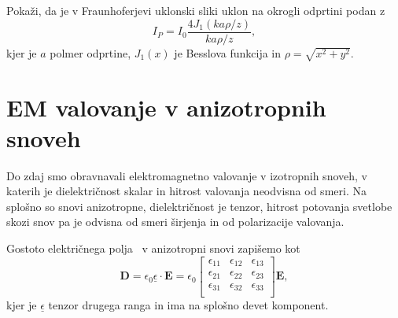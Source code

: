 \begin{definition}
\label{naloga-Frauhofer-Kirchhoff-uklon}
Pokaži, da je v Fraunhoferjevi uklonski sliki uklon na okrogli odprtini podan z
\begin{equation}
I_P = I_0\frac{4 J_1(k a \rho/ z)}{k a \rho/z},
\end{equation}
kjer je $a$ polmer odprtine, $J_1(x)$ je Besslova funkcija in $\rho = \sqrt{x^2+y^2}$.
\end{definition}

\section{EM valovanje v anizotropnih snoveh}\label{chap:anizotropni}
Do zdaj smo obravnavali elektromagnetno valovanje
v izotropnih snoveh, v katerih je dielektričnost skalar in hitrost 
valovanja neodvisna od smeri. Na splošno so snovi anizotropne,
dielektričnost je tenzor, hitrost potovanja svetlobe 
skozi snov pa je odvisna od smeri širjenja in od polarizacije valovanja. 

Gostoto električnega polja~ v anizotropni snovi zapišemo kot 
\begin{equation}
\mathbf{D}=\epsilon_{0}\underline{\epsilon} \cdot\mathbf{E} = 
\epsilon_{0}
\left[\begin{array}{ccc}
\epsilon_{11} & \epsilon_{12}& \epsilon_{13}\\
\epsilon_{21} & \epsilon_{22}& \epsilon_{23}\\
\epsilon_{31} & \epsilon_{32}& \epsilon_{33}\\
\end{array}\right]\mathbf{E},
\label{eq:gostota-elektricnega-polja-tenzor}
\end{equation}
kjer je $\underline{\epsilon}$ tenzor drugega ranga in ima na splošno devet komponent.

